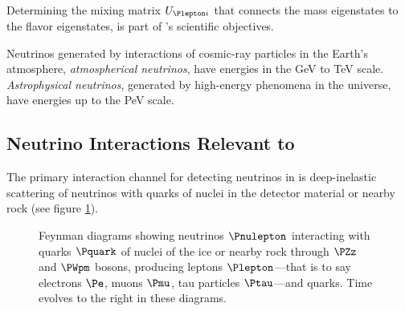 Determining the mixing matrix $U_{\Plepton i}$ that connects the mass eigenstates to the flavor eigenstates, is part of \icecube's scientific objectives.

Neutrinos generated by interactions of cosmic-ray particles in the Earth's atmosphere, \textit{atmospherical neutrinos}, have energies in the GeV to TeV scale. \textit{Astrophysical neutrinos}, generated by high-energy phenomena in the universe, have energies up to the PeV scale. \cite{instrumentation}


\subsection{Neutrino Interactions Relevant to \icecube}
\label{sec:neutrino_interactions}

The primary interaction channel for detecting neutrinos in \icecube is deep-inelastic scattering of neutrinos with quarks of nuclei in the detector material or nearby rock (see figure \ref{fig:Phei1oob}). \cite{energyreco}

\begin{figure}[htbp]
  \centering
  \hspace{1cm}
  \caption{Feynman diagrams showing neutrinos $\Pnulepton$ interacting with quarks $\Pquark$ of nuclei of the ice or nearby rock through $\PZz$ and $\PWpm$ bosons, producing leptons $\Plepton$---that is to say electrons $\Pe$, muons $\Pmu$, tau particles $\Ptau$---and quarks. Time evolves to the right in these diagrams.}
  \label{fig:Phei1oob}
\end{figure}

